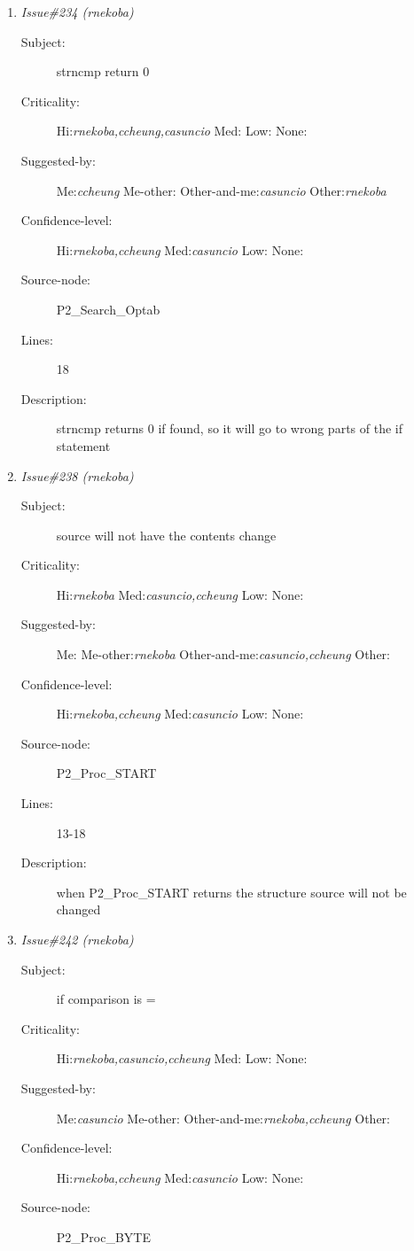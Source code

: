 \begin{enumerate}
\begin{description}
\item [Lines:] 13 15

\item [Description:] the then and else parts should be switched
\end{description}
\item {\it Issue\#234 (rnekoba)}
\begin{description}
\item [Subject:] strncmp return 0
\item [Criticality:] Hi:{\it rnekoba,ccheung,casuncio} Med:{\it } Low:{\it } None:{\it }
\item [Suggested-by:] Me:{\it ccheung} Me-other:{\it } Other-and-me:{\it casuncio} Other:{\it rnekoba}
\item [Confidence-level:] Hi:{\it rnekoba,ccheung} Med:{\it casuncio} Low:{\it } None:{\it }
\item [Source-node:] P2\_Search\_Optab

\item [Lines:] 18

\item [Description:] strncmp returns 0 if found, so it will go to
wrong parts of the if statement
\end{description}
\item {\it Issue\#238 (rnekoba)}
\begin{description}
\item [Subject:] source will not have the contents change
\item [Criticality:] Hi:{\it rnekoba} Med:{\it casuncio,ccheung} Low:{\it } None:{\it }
\item [Suggested-by:] Me:{\it } Me-other:{\it rnekoba} Other-and-me:{\it casuncio,ccheung} Other:{\it }
\item [Confidence-level:] Hi:{\it rnekoba,ccheung} Med:{\it casuncio} Low:{\it } None:{\it }
\item [Source-node:] P2\_Proc\_START

\item [Lines:] 13-18

\item [Description:] when P2\_Proc\_START returns the structure
source will not be changed
\end{description}
\item {\it Issue\#242 (rnekoba)}
\begin{description}
\item [Subject:] if comparison is =
\item [Criticality:] Hi:{\it rnekoba,casuncio,ccheung} Med:{\it } Low:{\it } None:{\it }
\item [Suggested-by:] Me:{\it casuncio} Me-other:{\it } Other-and-me:{\it rnekoba,ccheung} Other:{\it }
\item [Confidence-level:] Hi:{\it rnekoba,ccheung} Med:{\it casuncio} Low:{\it } None:{\it }
\item [Source-node:] P2\_Proc\_BYTE


\end{description}
\end{enumerate}
